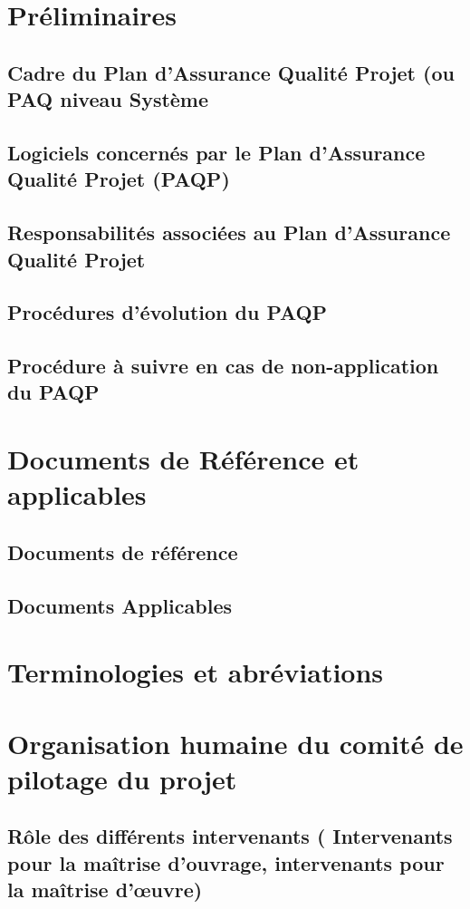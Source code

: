 \section{Préliminaires}
\subsection{Cadre du Plan d’Assurance Qualité Projet (ou PAQ niveau Système}
\subsection{Logiciels concernés par le Plan d’Assurance Qualité Projet (PAQP)}
\subsection{Responsabilités associées au Plan d’Assurance Qualité Projet}
\subsection{Procédures d’évolution du PAQP}
\subsection{Procédure à suivre en cas de non-application du  PAQP}


\section{Documents de Référence et applicables}
\subsection{Documents de référence}
\subsection{Documents Applicables}

\section{Terminologies et abréviations}
                                                              
\section{Organisation humaine du comité de pilotage du projet}
\subsection{Rôle des différents intervenants ( Intervenants pour la maîtrise d’ouvrage, intervenants pour la maîtrise d’œuvre)}
